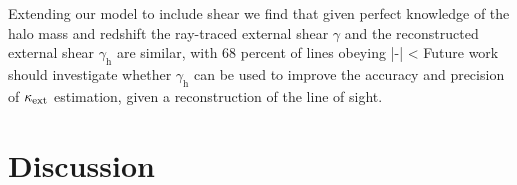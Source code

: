 \documentclass[useAMS,usenatbib,a4paper]{mn2e}
\begin{document}
Extending our model to include shear we find that given
perfect knowledge of the halo mass and redshift the ray-traced external shear
$\gamma$ and the reconstructed external shear $\gamma_{\mathrm{h}}$  are
similar, with 68 percent of lines obeying
\be
\label{eq:shearineq}
|{\boldmath{\gammax}-}| < 
\ee 
Future work should investigate whether $\gamma_{\mathrm{h}}$ can be used
to improve the accuracy and precision of $\kappa_{\rm ext}$ estimation, given a
reconstruction of the line of sight. 



\section{Discussion}
\label{sec:discuss}

\end{document}
